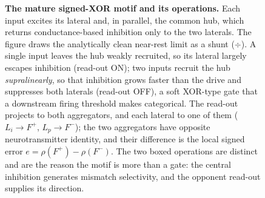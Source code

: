 \documentclass[11pt,a4paper]{article}
\begin{document}
\begin{figure}[t]

\caption{\textbf{The mature signed-XOR motif and its operations.} Each input
excites its lateral and, in parallel, the common hub, which returns
conductance-based inhibition only to the two laterals. The figure draws the
analytically clean near-rest limit as a shunt ($\div$). A single input leaves
the hub weakly recruited, so its lateral largely escapes inhibition (read-out
ON); two inputs recruit the hub \emph{supralinearly}, so that inhibition grows
faster than the drive and suppresses both laterals (read-out OFF), a soft
XOR-type gate that a downstream firing threshold makes categorical. The
read-out projects to both aggregators, and each lateral to one of them
($L_i\!\to\!F^{+}$, $L_p\!\to\!F^{-}$); the two aggregators have opposite
neurotransmitter identity, and their difference is the local signed error
$e=\rho(F^{+})-\rho(F^{-})$. The two boxed operations are distinct and are the
reason the motif is more than a gate: the central inhibition generates mismatch
selectivity, and the opponent read-out supplies its direction.}
\label{fig:mature}
\end{figure}
\end{document}
